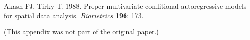 \documentclass[cmbright,fleqn,referee]{envauth}
\begin{document}
\begin{thebibliography}{}

Akash FJ, Tirky T. 1988. Proper multivariate conditional
autoregressive models for spatial data analysis. {\it Biometrics} {\bf 196}: 173.


\end{thebibliography}

\appendix



(This appendix was not part of the original paper.)
\end{document}
